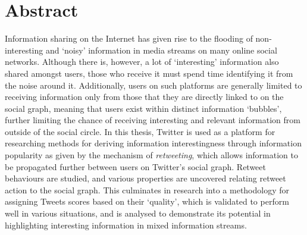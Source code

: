 



\chapter*{Abstract}
Information sharing on the Internet has given rise to the flooding of non-interesting and `noisy' information in media streams on many online social networks. Although there is, however, a lot of `interesting' information also shared amongst users, those who receive it must spend time identifying it from the noise around it. 
Additionally, users on such platforms are generally limited to receiving information only from those that they are directly linked to on the social graph, meaning that users exist within distinct information `bubbles', further limiting the chance of receiving interesting and relevant information from outside of the social circle. 
In this thesis, Twitter is used as a platform for researching methods for deriving information interestingness through information popularity as given by the mechanism of \textit{retweeting}, which allows information to be propagated further between users on Twitter's social graph. Retweet behaviours are studied, and various properties are uncovered relating retweet action to the social graph. This culminates in research into a methodology for assigning Tweets scores based on their `quality', which is validated to perform well in various situations, and is analysed to demonstrate its potential in highlighting interesting information in mixed information streams.


\tableofcontents

\listoffigures
\listoftables



